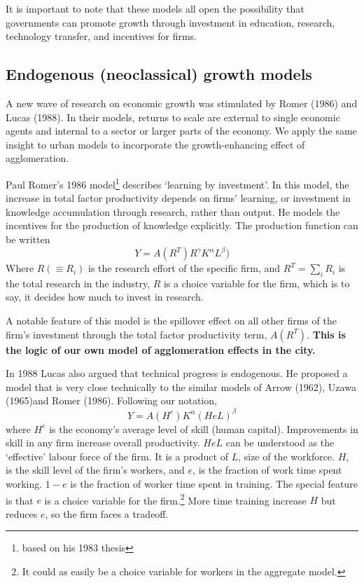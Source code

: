 It is important to note that these models all open the possibility that governments can  promote growth through investment in education, research, technology transfer, and incentives for firms.

\subsection{Endogenous (neoclassical) growth models}
A new wave of research on economic growth was stimulated by Romer (1986) and Lucas (1988). In their models, returns to scale are external to single economic agents and internal to a sector or larger parts of the economy. We apply the same insight to urban models to incorporate the growth-enhancing effect of agglomeration. 


Paul Romer's 1986  model\footnote{ based on his 1983 thesis} describes `learning by investment'. In this model, the increase in {total factor productivity} depends on firms’ learning, or investment in knowledge accumulation through research, rather than output. He models the incentives for the production of knowledge explicitly. The production function  can be written
\[Y = A(R^T)R^\gamma  K^\alpha L^\beta) \]
Where $R(\equiv R_i)$ is the research effort of the specific firm, and $R^T=\sum_iR_i$ is the total research in the industry,  $R$ is a choice variable for the firm, which is to say, it decides how much to invest in research. 

A notable feature of this model is the spillover effect on all other firms of the firm's investment through the \gls{total factor productivity} term,  $A(R^T)$. \textbf{This is the logic of our own model of agglomeration effects in the city.}

In 1988 Lucas also argued that technical progress is endogenous. He proposed a model that is very close technically to the similar models of Arrow (1962), Uzawa (1965)and Romer (1986). Following our notation, 
\[ Y = A(H^e) K^\alpha (HeL)^\beta \] 
where $H^e$ is the economy's average level of skill (human capital).  Improvements in skill in any firm  increase overall productivity.  $HeL$  can be understood as the `effective' labour force of the firm. It is a product of $L$, size of the workforce. $H$, is the skill level of the firm's workers, and $e$, is the fraction of work time spent working. $1-e$ is the fraction of worker time  spent in training. The  special feature is that $e$ is a choice variable for the firm.\footnote{It could as easily be a choice variable for workers in the aggregate model.} More time training increase $H$ but reduces $e$, so the firm faces a tradeoff.

